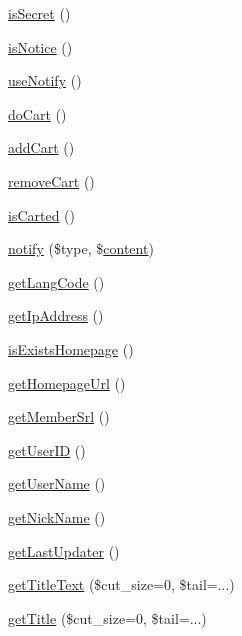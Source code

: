 \begin{DoxyCompactItemize}
\item 
\hyperlink{classdocumentItem_ae827d800e8fac709b217072f1580f8e4}{is\+Secret} ()
\item 
\hyperlink{classdocumentItem_a30a4b6ad6555ec8c83be2bbb01b29361}{is\+Notice} ()
\item 
\hyperlink{classdocumentItem_a25c9be892a37dbb3d519b980cd10930a}{use\+Notify} ()
\item 
\hyperlink{classdocumentItem_abac6ff72ec8faf238215dedb1df85569}{do\+Cart} ()
\item 
\hyperlink{classdocumentItem_af32d9aba9797f3a913ac66031304ee92}{add\+Cart} ()
\item 
\hyperlink{classdocumentItem_aa66932772c39aeff91238badd8246969}{remove\+Cart} ()
\item 
\hyperlink{classdocumentItem_a505c87502da3ca4b656230125ffa4f1e}{is\+Carted} ()
\item 
\hyperlink{classdocumentItem_afbccc4d35ce638fac62221e5602cc750}{notify} (\$type, \$\hyperlink{classcontent}{content})
\item 
\hyperlink{classdocumentItem_a7491640a855ace286820cb11f273ddb6}{get\+Lang\+Code} ()
\item 
\hyperlink{classdocumentItem_ac0e9b0006f067bc0918751148606d325}{get\+Ip\+Address} ()
\item 
\hyperlink{classdocumentItem_a7cc882ce0da6cbe675be8fdb980a0d97}{is\+Exists\+Homepage} ()
\item 
\hyperlink{classdocumentItem_ab9117599bb123e83289d2a24fd44bf50}{get\+Homepage\+Url} ()
\item 
\hyperlink{classdocumentItem_a75af5f05bd55c32bdc6c17dd8511e4e8}{get\+Member\+Srl} ()
\item 
\hyperlink{classdocumentItem_a66a8157a3cc7c82325eadcefe6390a58}{get\+User\+ID} ()
\item 
\hyperlink{classdocumentItem_a072696b683278c84bc3ebfee46d4216f}{get\+User\+Name} ()
\item 
\hyperlink{classdocumentItem_ab91ca9e1defb1a570212baa4f380706a}{get\+Nick\+Name} ()
\item 
\hyperlink{classdocumentItem_a784effc9e694d82da32e06e95482ff28}{get\+Last\+Updater} ()
\item 
\hyperlink{classdocumentItem_aad953dc30cf01a1d451cb90c66c09b0c}{get\+Title\+Text} (\$cut\+\_\+size=0, \$tail=\textquotesingle{}...\textquotesingle{})
\item 
\hyperlink{classdocumentItem_a365509266cc36e56b66df824bc2fcbfc}{get\+Title} (\$cut\+\_\+size=0, \$tail=\textquotesingle{}...\textquotesingle{})

\end{DoxyCompactItemize}
